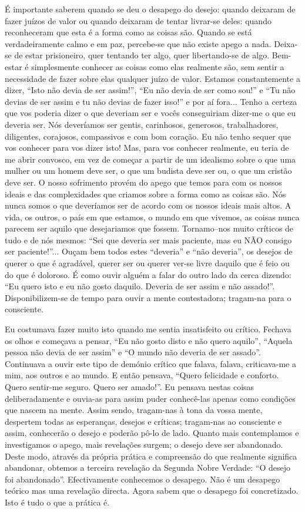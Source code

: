 É importante saberem quando se deu o desapego do
desejo: quando deixaram de fazer juízos de valor ou quando
deixaram de tentar livrar-se deles: quando reconheceram que
esta é a forma como as coisas são. Quando se está verdadeiramente 
calmo e em paz, percebe-se que não existe apego a
nada. Deixa-se de estar prisioneiro, quer tentando ter algo,
quer libertando-se de algo. Bem-estar é simplesmente conhecer
as coisas como elas realmente são, sem sentir a necessidade
de fazer sobre elas qualquer juízo de valor.
Estamos constantemente a dizer, “Isto não devia de ser
assim!”, “Eu não devia de ser como sou!” e “Tu não devias
de ser assim e tu não devias de fazer isso!” e por aí fora...
Tenho a certeza que vos poderia dizer o que deveriam ser e
vocês conseguiriam dizer-me o que eu deveria ser. Nós deveríamos ser gentis, carinhosos, generosos, trabalhadores, diligentes, corajosos, compassivos e com bom coração. Eu não
tenho sequer que vos conhecer para vos dizer isto! Mas, para
vos conhecer realmente, eu teria de me abrir convosco, em
vez de começar a partir de um idealismo sobre o que uma
mulher ou um homem deve ser, o que um budista deve ser ou,
o que um cristão deve ser.
O nosso sofrimento provém do apego que temos para
com os nossos ideais e das complexidades que criamos sobre
a forma como as coisas são. Nós nunca somos o que deveríamos ser de acordo com os nossos ideais mais altos. A vida, os
outros, o país em que estamos, o mundo em que vivemos, as
coisas nunca parecem ser aquilo que desejariamos que fossem.
Tornamo--nos muito críticos de tudo e de nós mesmos: “Sei
que deveria ser mais paciente, mas eu NÃO consigo ser
paciente!”... Ouçam bem todos estes “deveria” e “não deveria”,
os desejos de querer o que é agradável, querer ser ou querer
ver-se livre daquilo que é feio ou do que é doloroso. É como
ouvir alguém a falar do outro lado da cerca dizendo: “Eu
quero isto e eu não gosto daquilo. Deveria de ser assim e não
assado!”. Disponibilizem-se de tempo para ouvir a mente
contestadora; tragam-na para o consciente.

Eu costumava fazer muito isto quando me sentia insatisfeito ou crítico. Fechava os olhos e começava a pensar, “Eu
não gosto disto e não quero aquilo”, “Aquela pessoa não
devia de ser assim” e “O mundo não deveria de ser assado”.
Continuava a ouvir este tipo de demónio crítico que falava,
falava, criticava-me a mim, aos outros e ao mundo. E então
pensava, “Quero felicidade e conforto. Quero sentir-me seguro.
Quero ser amado!”. Eu pensava nestas coisas deliberadamente
e ouvia-as para assim puder conhecê-las apenas como
condições que nascem na mente. Assim sendo, tragam-nas à
tona da vossa mente, despertem todas as esperanças, desejos e
críticas; tragam-nas ao consciente e assim, conhecerão o desejo
e poderão pô-lo de lado.
Quanto mais contemplamos e investigamos o apego,
mais revelações surgem; o desejo deve ser abandonado. Deste
modo, através da própria prática e compreensão do que realmente significa abandonar, obtemos a terceira revelação da
Segunda Nobre Verdade: “O desejo foi abandonado”.
Efectivamente conhecemos o desapego. Não é um desapego
teórico mas uma revelação directa. Agora sabem que o
desapego foi concretizado. Isto é tudo o que a prática é.


